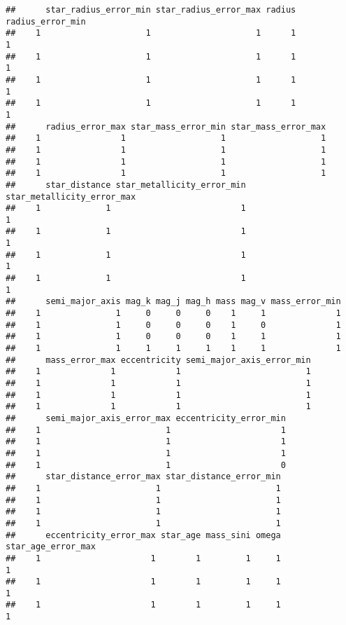 \documentclass[]{article}
\begin{document}
\begin{verbatim}
##      star_radius_error_min star_radius_error_max radius radius_error_min
##    1                     1                     1      1                1
##    1                     1                     1      1                1
##    1                     1                     1      1                1
##    1                     1                     1      1                1
##      radius_error_max star_mass_error_min star_mass_error_max
##    1                1                   1                   1
##    1                1                   1                   1
##    1                1                   1                   1
##    1                1                   1                   1
##      star_distance star_metallicity_error_min star_metallicity_error_max
##    1             1                          1                          1
##    1             1                          1                          1
##    1             1                          1                          1
##    1             1                          1                          1
##      semi_major_axis mag_k mag_j mag_h mass mag_v mass_error_min
##    1               1     0     0     0    1     1              1
##    1               1     0     0     0    1     0              1
##    1               1     0     0     0    1     1              1
##    1               1     1     1     1    1     1              1
##      mass_error_max eccentricity semi_major_axis_error_min
##    1              1            1                         1
##    1              1            1                         1
##    1              1            1                         1
##    1              1            1                         1
##      semi_major_axis_error_max eccentricity_error_min
##    1                         1                      1
##    1                         1                      1
##    1                         1                      1
##    1                         1                      0
##      star_distance_error_max star_distance_error_min
##    1                       1                       1
##    1                       1                       1
##    1                       1                       1
##    1                       1                       1
##      eccentricity_error_max star_age mass_sini omega star_age_error_max
##    1                      1        1         1     1                  1
##    1                      1        1         1     1                  1
##    1                      1        1         1     1                  1

\end{verbatim}
\end{document}
